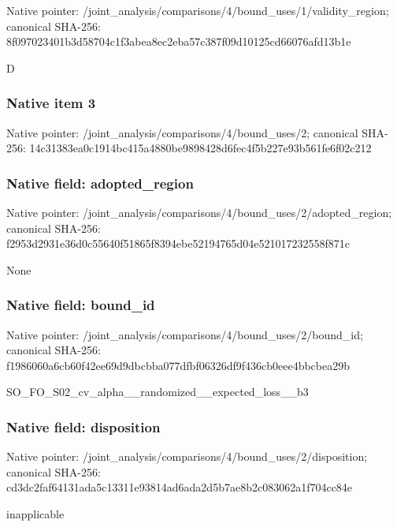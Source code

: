 \documentclass[10pt,a4paper]{article}
\begin{document}
Native pointer: /joint\_analysis/comparis\allowbreak{}ons/4/bound\_uses/1/valid\allowbreak{}ity\_region; canonical SHA-256: 8f097023401b3d58704c1f3a\allowbreak{}bea8ec2eba57c387f09d1012\allowbreak{}5cd66076afd13b1e


D


\subsubsection{Native item 3}


Native pointer: /joint\_analysis/comparis\allowbreak{}ons/4/bound\_uses/2; canonical SHA-256: 14c31383ea0c1914bc415a48\allowbreak{}80be9898428d6fec4f5b227e\allowbreak{}93b561fe6f02c212



\subsubsection{Native field: adopted\_region}


Native pointer: /joint\_analysis/comparis\allowbreak{}ons/4/bound\_uses/2/adopt\allowbreak{}ed\_region; canonical SHA-256: f2953d2931e36d0c55640f51\allowbreak{}865f8394ebe52194765d04e5\allowbreak{}21017232558f871c


None


\subsubsection{Native field: bound\_id}


Native pointer: /joint\_analysis/comparis\allowbreak{}ons/4/bound\_uses/2/bound\allowbreak{}\_id; canonical SHA-256: f1986060a6cb60f42ee69d9d\allowbreak{}bcbba077dfbf06326df9f436\allowbreak{}cb0eee4bbcbea29b


SO\_FO\_S02\_cv\_alpha\_\_rand\allowbreak{}omized\_\_expected\_loss\_\_b\allowbreak{}3


\subsubsection{Native field: disposition}


Native pointer: /joint\_analysis/comparis\allowbreak{}ons/4/bound\_uses/2/dispo\allowbreak{}sition; canonical SHA-256: cd3dc2faf64131ada5c13311\allowbreak{}e93814ad6ada2d5b7ae8b2c0\allowbreak{}83062a1f704cc84e


inapplicable
\end{document}
